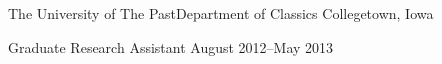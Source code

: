 

\headedsection %
{The University of The Past\bull Department of Classics}
{Collegetown, Iowa} {

\headedsubsection %
{Graduate Research Assistant}
{August 2012--May 2013}
{}



}


\spacedhrule{0.5em}{-0.4em} %
